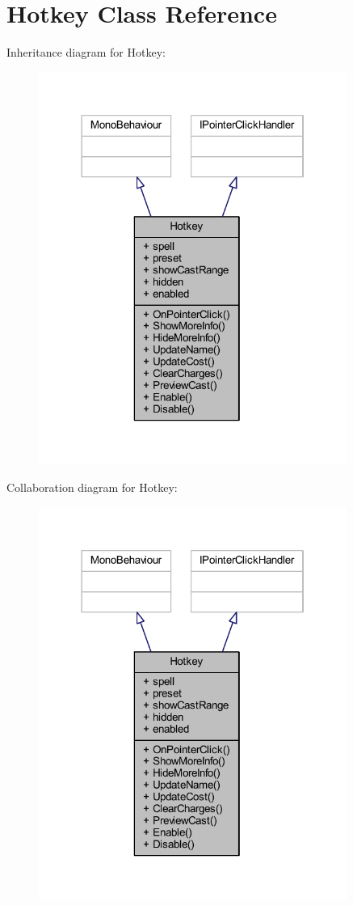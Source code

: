 \hypertarget{class_hotkey}{}\section{Hotkey Class Reference}
\label{class_hotkey}


Inheritance diagram for Hotkey\+:\nopagebreak
\begin{figure}[H]
\begin{center}
\leavevmode
\includegraphics[width=286pt]{class_hotkey__inherit__graph}
\end{center}
\end{figure}


Collaboration diagram for Hotkey\+:\nopagebreak
\begin{figure}[H]
\begin{center}
\leavevmode
\includegraphics[width=286pt]{class_hotkey__coll__graph}
\end{center}
\end{figure}
